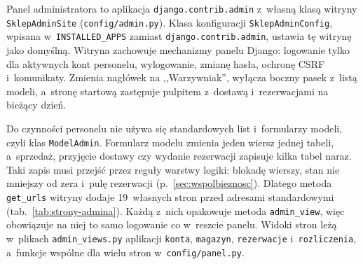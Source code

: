 \documentclass[12pt,a4paper,oneside]{article}
\newcounter{pu}
\begin{document}
Panel administratora to aplikacja \texttt{django.contrib.admin} z~własną klasą witryny \texttt{SklepAdminSite} (\texttt{config/admin.py}). Klasa konfiguracji \texttt{SklepAdminConfig}, wpisana w~\texttt{INSTALLED\_APPS} zamiast \texttt{django.contrib.admin}, ustawia tę witrynę jako domyślną. Witryna zachowuje mechanizmy panelu Django: logowanie tylko dla aktywnych kont personelu, wylogowanie, zmianę hasła, ochronę CSRF i~komunikaty. Zmienia nagłówek na ,,Warzywniak'', wyłącza boczny pasek z~listą modeli, a~stronę startową zastępuje pulpitem z~dostawą i~rezerwacjami na bieżący dzień.

Do czynności personelu nie używa się standardowych list i~formularzy modeli, czyli klas \texttt{ModelAdmin}. Formularz modelu zmienia jeden wiersz jednej tabeli, a~sprzedaż, przyjęcie dostawy czy wydanie rezerwacji zapisuje kilka tabel naraz. Taki zapis musi przejść przez reguły warstwy logiki: blokadę wierszy, stan nie mniejszy od zera i~pulę rezerwacji (p.~\ref{sec:wspolbieznosc}). Dlatego metoda \texttt{get\_urls} witryny dodaje 19~własnych stron przed adresami standardowymi (tab.~\ref{tab:strony-admina}). Każdą z~nich opakowuje metoda \texttt{admin\_view}, więc obowiązuje na niej to samo logowanie co w~reszcie panelu. Widoki stron leżą w~plikach \texttt{admin\_views.py} aplikacji \texttt{konta}, \texttt{magazyn}, \texttt{rezerwacje} i~\texttt{rozliczenia}, a~funkcje wspólne dla wielu stron w~\texttt{config/panel.py}.
\end{document}
